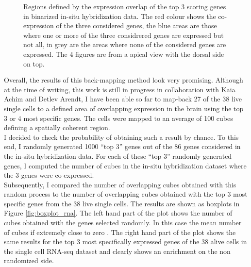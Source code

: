 \begin{figure}[H]
        \caption{Regions defined by the expression overlap of the top 3 scoring genes in \citep{Tomer10} binarized in-situ hybridization data. The red colour shows the co-expression of the three considered genes, the blue areas are those where one or more of the three considrered genes are expressed but not all, in grey are the areas where none of the considered genes are expressed. The 4 figures are from a apical view with the dorsal side on top.}\label{fig:cell_localization}
\end{figure}

Overall, the results of this back-mapping method look very promising. Although at the time of writing, this work is still in progress in collaboration with Kaia Achim and Detlev Arendt, I have been able so far to map-back 27 of the 38 live single cells to a defined area of overlapping expression in the brain using the top 3 or 4 most specific genes. The cells were mapped to an average of 100 cubes defining a spatially coherent region. \\

I decided to check the probability of obtaining such a result by chance. To this end, I randomly generated 1000 ``top 3'' genes out of the 86 genes considered in the in-situ hybridization data. For each of these ``top 3'' randomly generated genes, I computed the number of cubes in the in-situ hybridization dataset where the 3 genes were co-expressed.\\

Subsequently, I compared the number of overlapping cubes obtained with this random process to the number of overlapping cubes obtained with the top 3 most specific genes from the 38 live single cells. The results are shown as boxplots in Figure \ref{fig:boxplot_rna}. The left hand part of the plot shows the number of cubes obtained with the genes selected randomly. In this case the mean number of cubes if extremely close to zero . The right hand part of the plot shows the same results for the top 3 most specifically expressed genes of the 38 alive cells in the single cell RNA-seq dataset and clearly shows an enrichment on the non randomized side. 

